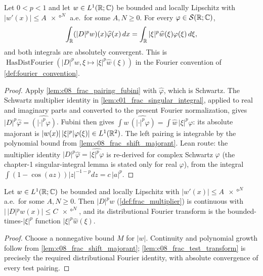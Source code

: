 \begin{lemma}
  \label{lem:c08_frac_test_transform}
  Let $0<p<1$ and let $w\in L^1(\mathbb{R};\mathbb{C})$ be bounded and locally Lipschitz with
  $|w'(x)|\le A\ang{x}^N$ a.e.\ for some $A,N\ge0$. For every $\varphi\in\mathcal S(\mathbb{R};\mathbb{C})$,
  \[
    \int_{\mathbb{R}}(|D|^pw)(x)\widehat\varphi(x)\,dx
      =\int_{\mathbb{R}} |\xi|^p\widehat w(\xi)\varphi(\xi)\,d\xi,
  \]
  and both integrals are absolutely convergent. This is
  $\operatorname{HasDistFourier}(|D|^pw,\xi\mapsto|\xi|^p\widehat w(\xi))$
  in the Fourier convention of \cref{def:fourier_convention}.
\end{lemma}
\begin{proof}
  Apply \cref{lem:c08_frac_pairing_fubini} with $\widehat\varphi$, which is Schwartz.
  The Schwartz multiplier identity in \cref{lem:c01_frac_singular_integral}, applied to real and
  imaginary parts and converted to the present Fourier normalization, gives
  $|D|^p\widehat\varphi=\widehat{(|\cdot|^p\varphi)}$.
  Fubini then gives $\int w\,\widehat{(|\cdot|^p\varphi)}=\int\widehat w\,|\xi|^p\varphi$:
  its absolute majorant is $|w(x)|\,|\xi|^p|\varphi(\xi)|\in L^1(\mathbb{R}^2)$.
  The left pairing is integrable by the polynomial bound from \cref{lem:c08_frac_shift_majorant}.
  Lean route: the multiplier identity $|D|^p\hat\varphi=\widehat{|\xi|^p\varphi}$ is re-derived for complex Schwartz $\varphi$ (the chapter-1 singular-integral lemma is stated only for real $\varphi$), from the integral $\int(1-\cos(az))|z|^{-1-p}dz=c\,|a|^p$.
\end{proof}

\begin{lemma}
  \label{lem:c08_frac_kernel_fourier}
  Let $w\in L^1(\mathbb{R};\mathbb{C})$ be bounded and locally Lipschitz with $|w'(x)|\le A\ang{x}^N$ a.e.\ for some $A,N\ge0$.
  Then $|D|^pw$ (\cref{def:frac_multiplier}) is continuous with $|\,|D|^pw(x)|\le C\ang{x}^N$, and its
  distributional Fourier transform is the bounded-times-$|\xi|^p$ function $|\xi|^p\widehat w(\xi)$.
\end{lemma}
\begin{proof}
  Choose a nonnegative bound $M$ for $|w|$. Continuity and polynomial growth follow from
  \cref{lem:c08_frac_shift_majorant}; \cref{lem:c08_frac_test_transform} is precisely the required
  distributional Fourier identity, with absolute convergence of every test pairing.
\end{proof}

